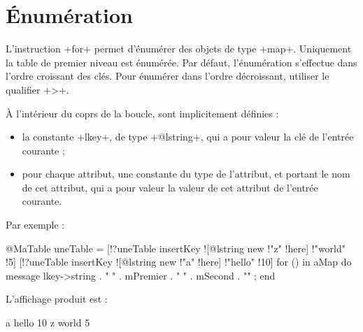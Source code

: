 \section{Énumération}

L'instruction \ggs+for+ permet d'énumérer des objets de type \ggs+map+. Uniquement la table de premier niveau est énumérée. Par défaut, l'énumération s'effectue dans l'ordre croissant des clés. Pour énumérer dans l'ordre décroissant, utiliser le qualifier \ggs+>+.

À l'intérieur du coprs de la boucle, sont implicitement définies :
\begin{itemize}
  \item la constante \ggs+lkey+, de type \ggs+@lstring+, qui a pour valeur la clé de l'entrée courante ;
  \item pour chaque attribut, une constante du type de l'attribut, et portant le nom de cet attribut, qui a pour valeur la valeur de cet attribut de l'entrée courante.
\end{itemize}

Par exemple :
\begin{galgascode}
@MaTable uneTable = {}
[!?uneTable insertKey ![@lstring new !"z" !here] !"world" !5]
[!?uneTable insertKey ![@lstring new !"a" !here] !"hello" !10]
for () in aMap do
  message lkey->string . " " . mPremier . " " . mSecond . "\n" ;
end
\end{galgascode}

L'affichage produit est :

\begin{galgascode}
a hello 10
z world 5
\end{galgascode}

